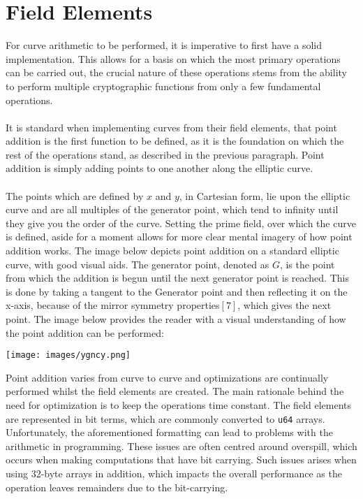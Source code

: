 \documentclass{article}
\begin{document}
\section{Field Elements}
For curve arithmetic to be performed, it is imperative to first have a solid implementation. This allows for a basis on which the most primary operations can be carried out, the crucial nature of these operations stems from the ability to perform multiple cryptographic functions from only a few fundamental operations. \\\\
It is standard when implementing curves from their field elements, that point addition is the first function to be defined, as it is the foundation on which the rest of the operations stand, as described in the previous paragraph. Point addition is simply adding points to one another along the elliptic curve.\\\\
The points which are defined by $x$ and $y$, in Cartesian form, lie upon the elliptic curve and are all multiples of the generator point, which tend to infinity until they give you the order of the curve. Setting the prime field, over which the curve is defined, aside for a moment allows for more clear mental imagery of how point addition works. The image below depicts point addition on a standard elliptic curve, with good visual aids. The generator point, denoted as $G$, is the point from which the addition is begun until the next generator point is reached. This is done by taking a tangent to the Generator point and then reflecting it on the x-axis, because of the mirror symmetry properties$[7]$, which gives the next point. The image below provides the reader with a visual understanding of how the point addition can be performed:
\begin{center}
\texttt{[image: images/ygncy.png]}
\end{center}
Point addition varies from curve to curve and optimizations are continually performed whilst the field elements are created. The main rationale behind the need for optimization is to keep the operations time constant. The field elements are represented in bit terms, which are commonly converted to \texttt{u64} arrays. Unfortunately, the aforementioned formatting can lead to problems with the arithmetic in programming. These issues are often centred around overspill, which occurs when making computations that have bit carrying. Such issues arises when using 32-byte arrays in addition, which impacts the overall performance as the operation leaves remainders due to the bit-carrying.\\\\
\end{document}
